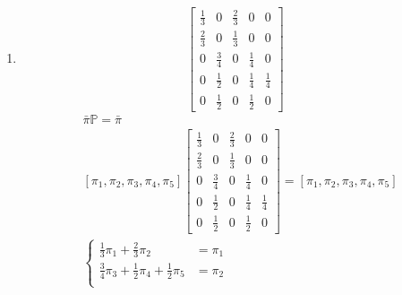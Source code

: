 \begin{enumerate}[label=\alph*)]
\begin{align*}
\begin{matrix}
\frac{1}{3} \pi _2 + \frac{1}{3} \pi _4 &= \pi _3\\
\pi _4 &= \frac{3}{2}\pi _1
\end{matrix}\right. \Leftrightarrow \left\{\begin{matrix}
\pi _1  &= \pi _3\\
\pi _2 & = \frac{3}{2}\pi _1\\
\frac{1}{3} \pi _2 + \frac{1}{3} \pi _4 &= \pi _3\\
\pi _4 &= \frac{3}{2}\pi _1
\end{matrix}\right.\Leftrightarrow \left\{\begin{matrix}
\pi _1  &= \pi _3\\
\pi _2 & = \frac{3}{2}\pi _1\\
\pi _3 &= \pi _1\\
\pi _4 &= \frac{3}{2}\pi _1
\end{matrix}\right.\\
& x + \frac{3}{2}x+x+\frac{3}{2}x = 1\Leftrightarrow 5x = 1\Leftrightarrow x = \frac{1}{5} = 0.2
\end{align*}
Rozkład stacjonarny ma postać: $\left[\frac{1}{5}, \frac{3}{10}, \frac{1}{5}, \frac{3}{10}\right]$
\item 
$$\begin{bmatrix}
\frac{1}{3}&0&\frac{2}{3}&0&0\\
\frac{2}{3}&0&\frac{1}{3}&0&0\\
0&\frac{3}{4}&0&\frac{1}{4}&0\\
0&\frac{1}{2}&0&\frac{1}{4}&\frac{1}{4}\\
0&\frac{1}{2}&0&\frac{1}{2}&0
\end{bmatrix}$$
\begin{align*}
&\bar{\pi}\mathbb{P}=\bar{\pi}\\
&\left[\pi _1, \pi _2,\pi _3,\pi _4,\pi _5\right]\begin{bmatrix}
\frac{1}{3}&0&\frac{2}{3}&0&0\\
\frac{2}{3}&0&\frac{1}{3}&0&0\\
0&\frac{3}{4}&0&\frac{1}{4}&0\\
0&\frac{1}{2}&0&\frac{1}{4}&\frac{1}{4}\\
0&\frac{1}{2}&0&\frac{1}{2}&0
\end{bmatrix}=\left[\pi _1, \pi _2,\pi _3,\pi _4,\pi _5\right]\\
&\left\{\begin{matrix}
\frac{1}{3}\pi _1+\frac{2}{3}\pi _2 &= \pi _1\\
\frac{3}{4}\pi _3 + \frac{1}{2}\pi _4+\frac{1}{2}\pi _5 &= \pi _2\\

\end{matrix}
\end{align*}
\end{enumerate}
